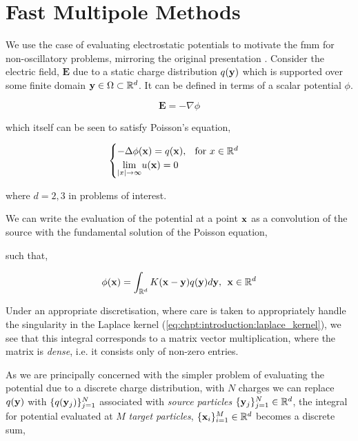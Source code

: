 
\section{Fast Multipole Methods}\label{chpt:fmm:sec:generic}

We use the case of evaluating electrostatic potentials to motivate the \acrshort{fmm} for non-oscillatory problems, mirroring the original presentation \cite{greengard1987fast}. Consider the electric field, $\mathbf{E}$ due to a static charge distribution $q(\mathbf{y})$ which is supported over some finite domain $\mathbf{y} \in \Omega \subset \mathbb{R}^d$. It can be defined in terms of a scalar potential $\phi$.

\begin{equation*}
\mathbf{E} = -\nabla \phi
\end{equation*}

which itself can be seen to satisfy Poisson's equation,

\begin{equation*}
    \begin{cases}
        - \Delta \phi(\mathbf{x}) = q(\mathbf{x}), \> \> \text{  for } x\in \mathbb{R}^d \\
        \underset{|x| \rightarrow \infty}{\lim } u(\mathbf{x}) = 0
    \end{cases}
\end{equation*}


where $d=2,3$ in problems of interest.

We can write the evaluation of the potential at a point $\mathbf{x}$ as a convolution of the source with the fundamental solution of the Poisson equation,

such that,

\begin{equation}
\phi(\mathbf{x}) = \int_{\mathbb{R}^d} K(\mathbf{x}-\mathbf{y})q(\mathbf{y}) d\mathbf{y}, \> \> \mathbf{x} \in \mathbb{R}^d
\end{equation}\label{eq:chpt:fmm:laplace_potential_integral}

Under an appropriate discretisation, where care is taken to appropriately handle the singularity in the Laplace kernel (\ref{eq:chpt:introduction:laplace_kernel}), we see that this integral corresponds to a matrix vector multiplication, where the matrix is \textit{dense}, i.e. it consists only of non-zero entries.

As we are principally concerned with the simpler problem of evaluating the potential due to a discrete charge distribution, with $N$ charges we can replace $q(\mathbf{y})$ with $\{ q(\mathbf{y}_j) \}_{j=1}^N$ associated with \textit{source particles} $\{\mathbf{y}_j\}_{j=1}^N \in \mathbb{R}^d$, the integral for potential evaluated at $M$ \textit{target particles}, $\{\mathbf{x}_i \}_{i=1}^M \in \mathbb{R}^d$ becomes a discrete sum,

